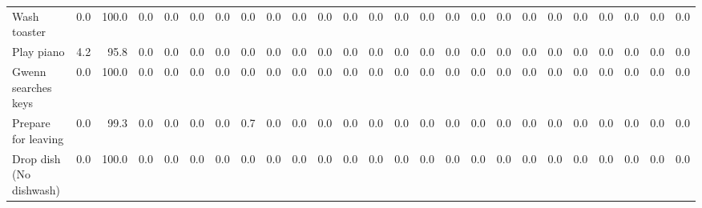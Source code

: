 \documentclass{article}
\begin{document}
\begin{sideways}
\begin{tabular}{lrrrrrrrrrrrrrrrrrrrrrrrr}
Wash toaster            &         0.0 &                    100.0 &               0.0 &                0.0 &                0.0 &            0.0 &              0.0 &                0.0 &                   0.0 &                   0.0 &                0.0 &                0.0 &                    0.0 &               0.0 &               0.0 &              0.0 &                   0.0 &             0.0 &                          0.0 &                 0.0 &               0.0 &                        0.0 &                        0.0 &                            0.0 \\
Play piano              &         4.2 &                     95.8 &               0.0 &                0.0 &                0.0 &            0.0 &              0.0 &                0.0 &                   0.0 &                   0.0 &                0.0 &                0.0 &                    0.0 &               0.0 &               0.0 &              0.0 &                   0.0 &             0.0 &                          0.0 &                 0.0 &               0.0 &                        0.0 &                        0.0 &                            0.0 \\
Gwenn searches keys     &         0.0 &                    100.0 &               0.0 &                0.0 &                0.0 &            0.0 &              0.0 &                0.0 &                   0.0 &                   0.0 &                0.0 &                0.0 &                    0.0 &               0.0 &               0.0 &              0.0 &                   0.0 &             0.0 &                          0.0 &                 0.0 &               0.0 &                        0.0 &                        0.0 &                            0.0 \\
Prepare for leaving     &         0.0 &                     99.3 &               0.0 &                0.0 &                0.0 &            0.0 &              0.7 &                0.0 &                   0.0 &                   0.0 &                0.0 &                0.0 &                    0.0 &               0.0 &               0.0 &              0.0 &                   0.0 &             0.0 &                          0.0 &                 0.0 &               0.0 &                        0.0 &                        0.0 &                            0.0 \\
Drop dish (No dishwash) &         0.0 &                    100.0 &               0.0 &                0.0 &                0.0 &            0.0 &              0.0 &                0.0 &                   0.0 &                   0.0 &                0.0 &                0.0 &                    0.0 &               0.0 &               0.0 &              0.0 &                   0.0 &             0.0 &                          0.0 &                 0.0 &               0.0 &                        0.0 &                        0.0 &                            0.0 \\
\bottomrule
\end{tabular}
\end{sideways}
\end{document}
